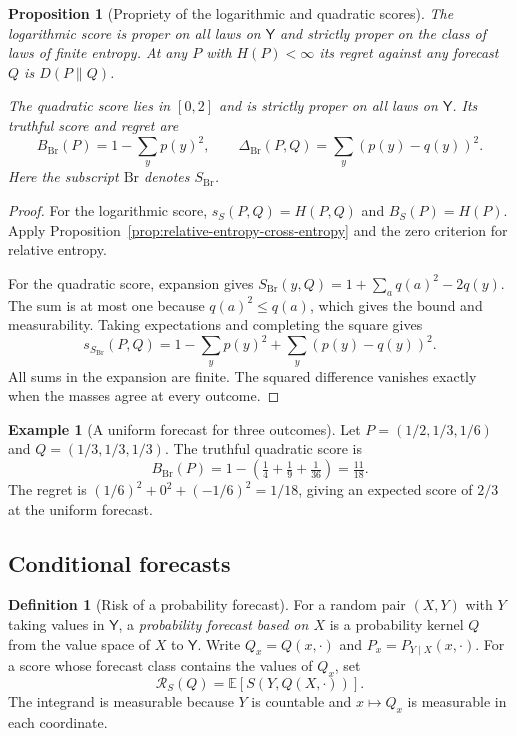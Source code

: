 \documentclass[11pt,oneside]{book}
\newtheorem{proposition}[theorem]{Proposition}
\theoremstyle{definition}
\newtheorem{definition}[theorem]{Definition}
\newtheorem{example}[theorem]{Example}
\theoremstyle{remark}
\begin{document}
\begin{proposition}[Propriety of the logarithmic and quadratic scores]
\label{prop:log-quadratic-strictly-proper}
The logarithmic score is proper on all laws on $\mathsf Y$ and
strictly proper on the class of laws of finite entropy. At any
$P$ with $H(P)<\infty$ its regret against any forecast $Q$ is
$D(P\|Q)$.

The quadratic score lies in $[0,2]$ and is strictly proper on all
laws on $\mathsf Y$. Its truthful score and regret are
\[
B_{\mathrm{Br}}(P)=1-\sum_y p(y)^2,\qquad
\Delta_{\mathrm{Br}}(P,Q)=\sum_y(p(y)-q(y))^2.
\]
Here the subscript $\mathrm{Br}$ denotes $S_{\mathrm{Br}}$.
\end{proposition}
\begin{proof}
For the logarithmic score, $s_S(P,Q)=H(P,Q)$ and
$B_S(P)=H(P)$. Apply Proposition~\ref{prop:relative-entropy-cross-entropy}
and the zero criterion for relative entropy.

For the quadratic score, expansion gives
$S_{\mathrm{Br}}(y,Q)=1+\sum_a q(a)^2-2q(y)$. The sum is at most
one because $q(a)^2\leq q(a)$, which gives the bound and
measurability. Taking expectations and completing the square gives
\[
s_{S_{\mathrm{Br}}}(P,Q)
=1-\sum_y p(y)^2+\sum_y(p(y)-q(y))^2.
\]
All sums in the expansion are finite. The squared difference
vanishes exactly when the masses agree at every outcome.
\end{proof}

\begin{example}[A uniform forecast for three outcomes]
\label{ex:brier-score-three-outcomes}
Let $P=(1/2,1/3,1/6)$ and $Q=(1/3,1/3,1/3)$. The truthful
quadratic score is
\[
B_{\mathrm{Br}}(P)=1-\left(\tfrac14+\tfrac19+\tfrac1{36}\right)
=\tfrac{11}{18}.
\]
The regret is $(1/6)^2+0^2+(-1/6)^2=1/18$, giving an
expected score of $2/3$ at the uniform forecast.
\end{example}

\subsection{Conditional forecasts}
\label{subsec:proper-conditional-forecasts}

\begin{definition}[Risk of a probability forecast]
\label{def:probability-forecast-risk}
For a random pair $(X,Y)$ with $Y$ taking values in $\mathsf Y$,
a \emph{probability forecast based on $X$} is a probability kernel
$Q$ from the value space of $X$ to $\mathsf Y$. Write
$Q_x=Q(x,\cdot)$ and $P_x=P_{Y\mid X}(x,\cdot)$.
For a score whose forecast class contains the values of $Q_x$, set
\[
\mathcal R_S(Q)=\mathbb E[S(Y,Q(X,\cdot))].
\]
The integrand is measurable because $Y$ is countable and
$x\mapsto Q_x$ is measurable in each coordinate.
\end{definition}
\end{document}
